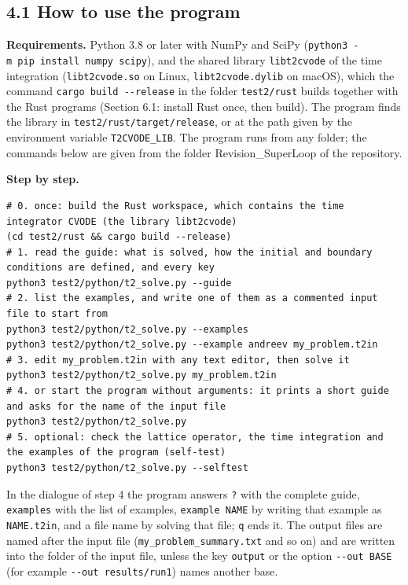\documentclass[
  10pt,
]{article}
\begin{document}
\hypertarget{how-to-use-the-program}{%
\subsection{4.1 How to use the program}\label{how-to-use-the-program}}

\textbf{Requirements.} Python 3.8 or later with NumPy and SciPy
(\texttt{python3\ -m\ pip\ install\ numpy\ scipy}), and the shared
library \texttt{libt2cvode} of the time integration
(\texttt{libt2cvode.so} on Linux, \texttt{libt2cvode.dylib} on macOS),
which the command \texttt{cargo\ build\ -\/-release} in the folder
\texttt{test2/rust} builds together with the Rust programs (Section 6.1:
install Rust once, then build). The program finds the library in
\texttt{test2/rust/target/release}, or at the path given by the
environment variable \texttt{T2CVODE\_LIB}. The program runs from any
folder; the commands below are given from the folder Revision\_SuperLoop
of the repository.

\textbf{Step by step.}

\begin{verbatim}
# 0. once: build the Rust workspace, which contains the time integrator CVODE (the library libt2cvode)
(cd test2/rust && cargo build --release)
# 1. read the guide: what is solved, how the initial and boundary conditions are defined, and every key
python3 test2/python/t2_solve.py --guide
# 2. list the examples, and write one of them as a commented input file to start from
python3 test2/python/t2_solve.py --examples
python3 test2/python/t2_solve.py --example andreev my_problem.t2in
# 3. edit my_problem.t2in with any text editor, then solve it
python3 test2/python/t2_solve.py my_problem.t2in
# 4. or start the program without arguments: it prints a short guide and asks for the name of the input file
python3 test2/python/t2_solve.py
# 5. optional: check the lattice operator, the time integration and the examples of the program (self-test)
python3 test2/python/t2_solve.py --selftest
\end{verbatim}

In the dialogue of step 4 the program answers \texttt{?} with the
complete guide, \texttt{examples} with the list of examples,
\texttt{example\ NAME} by writing that example as \texttt{NAME.t2in},
and a file name by solving that file; \texttt{q} ends it. The output
files are named after the input file (\texttt{my\_problem\_summary.txt}
and so on) and are written into the folder of the input file, unless the
key \texttt{output} or the option \texttt{-\/-out\ BASE} (for example
\texttt{-\/-out\ results/run1}) names another base.
\end{document}
